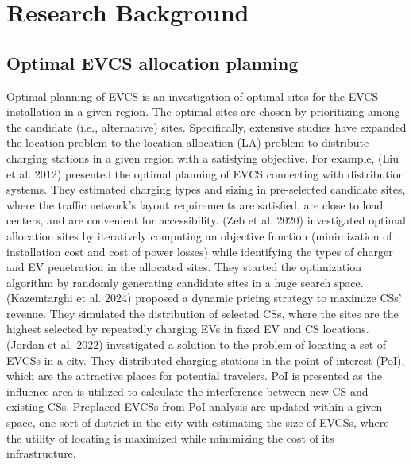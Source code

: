\documentclass[preprint,12pt]{elsarticle}
\begin{document}
\vspace{0.5cm}

\section{Research Background}

\subsection{Optimal EVCS allocation planning}
Optimal planning of EVCS is an investigation of optimal sites for the EVCS installation in a given region. The optimal sites are chosen by prioritizing among the candidate (i.e., alternative) sites. Specifically, extensive studies have expanded the location problem to the location-allocation (LA) problem to distribute charging stations in a given region with a satisfying objective. For example, (Liu et al. 2012) presented the optimal planning of EVCS connecting with distribution systems. They estimated charging types and sizing in pre-selected candidate sites, where the traffic network's layout requirements are satisfied, are close to load centers, and are convenient for accessibility. (Zeb et al. 2020) investigated optimal allocation sites by iteratively computing an objective function (minimization of installation cost and cost of power losses) while identifying the types of charger and EV penetration in the allocated sites. They started the optimization algorithm by randomly generating candidate sites in a huge search space. (Kazemtarghi et al. 2024) proposed a dynamic pricing strategy to maximize CSs' revenue. They simulated the distribution of selected CSs, where the sites are the highest selected by repeatedly charging EVs in fixed EV and CS locations. (Jordan et al. 2022) investigated a solution to the problem of locating a set of EVCSs in a city. They distributed charging stations in the point of interest (PoI), which are the attractive places for potential travelers. PoI is presented as the influence area is utilized to calculate the interference between new CS and existing CSs. Preplaced EVCSs from PoI analysis are updated within a given space, one sort of district in the city with estimating the size of EVCSs, where the utility of locating is maximized while minimizing the cost of its infrastructure. 

\vspace{0.5cm}
\end{document}
